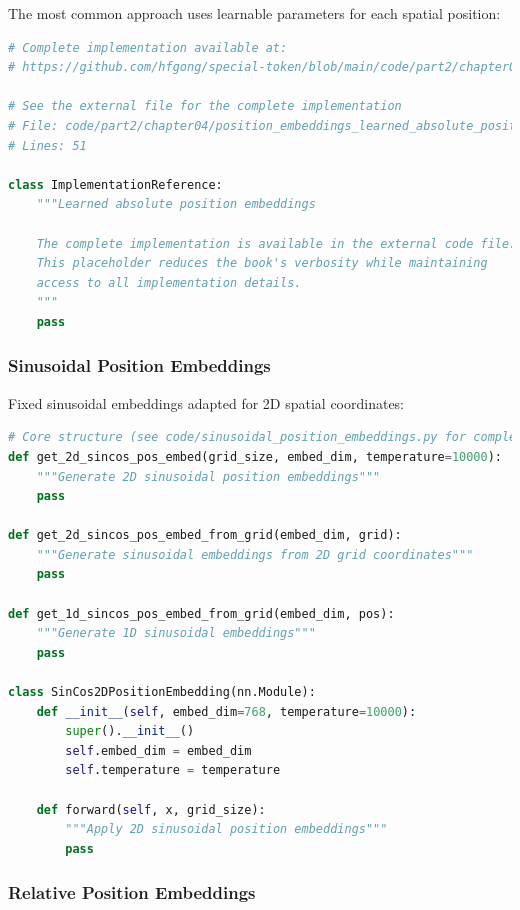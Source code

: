 The most common approach uses learnable parameters for each spatial position:

\begin{lstlisting}[language=Python, caption={Learned absolute position embeddings}]
# Complete implementation available at:
# https://github.com/hfgong/special-token/blob/main/code/part2/chapter04/position_embeddings_learned_absolute_position_embe.py

# See the external file for the complete implementation
# File: code/part2/chapter04/position_embeddings_learned_absolute_position_embe.py
# Lines: 51

class ImplementationReference:
    """Learned absolute position embeddings
    
    The complete implementation is available in the external code file.
    This placeholder reduces the book's verbosity while maintaining
    access to all implementation details.
    """
    pass
\end{lstlisting}

\subsubsection{Sinusoidal Position Embeddings}

Fixed sinusoidal embeddings adapted for 2D spatial coordinates:

\begin{lstlisting}[language=Python, caption=2D sinusoidal position embeddings]
# Core structure (see code/sinusoidal_position_embeddings.py for complete implementation)
def get_2d_sincos_pos_embed(grid_size, embed_dim, temperature=10000):
    """Generate 2D sinusoidal position embeddings"""
    pass

def get_2d_sincos_pos_embed_from_grid(embed_dim, grid):
    """Generate sinusoidal embeddings from 2D grid coordinates"""
    pass

def get_1d_sincos_pos_embed_from_grid(embed_dim, pos):
    """Generate 1D sinusoidal embeddings"""
    pass

class SinCos2DPositionEmbedding(nn.Module):
    def __init__(self, embed_dim=768, temperature=10000):
        super().__init__()
        self.embed_dim = embed_dim
        self.temperature = temperature
    
    def forward(self, x, grid_size):
        """Apply 2D sinusoidal position embeddings"""
        pass
\end{lstlisting}

\subsubsection{Relative Position Embeddings}

